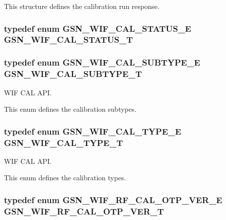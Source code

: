 This structure defines the calibration run response. \hypertarget{a00607_aa763754f7a0152deadf587aad20f022c}{
\subsubsection[{GSN\_\-WIF\_\-CAL\_\-STATUS\_\-T}]{\setlength{\rightskip}{0pt plus 5cm}typedef enum {\bf GSN\_\-WIF\_\-CAL\_\-STATUS\_\-E}  {\bf GSN\_\-WIF\_\-CAL\_\-STATUS\_\-T}}}
\label{a00607_aa763754f7a0152deadf587aad20f022c}
\hypertarget{a00607_a6fed31ed15a2c8f32a4bda91ae7c7870}{
\subsubsection[{GSN\_\-WIF\_\-CAL\_\-SUBTYPE\_\-T}]{\setlength{\rightskip}{0pt plus 5cm}typedef enum {\bf GSN\_\-WIF\_\-CAL\_\-SUBTYPE\_\-E}  {\bf GSN\_\-WIF\_\-CAL\_\-SUBTYPE\_\-T}}}
\label{a00607_a6fed31ed15a2c8f32a4bda91ae7c7870}


WIF CAL API. 

This enum defines the calibration subtypes. \hypertarget{a00607_a9dc79fa491ceafce8c7f71c92861bb43}{
\subsubsection[{GSN\_\-WIF\_\-CAL\_\-TYPE\_\-T}]{\setlength{\rightskip}{0pt plus 5cm}typedef enum {\bf GSN\_\-WIF\_\-CAL\_\-TYPE\_\-E}  {\bf GSN\_\-WIF\_\-CAL\_\-TYPE\_\-T}}}
\label{a00607_a9dc79fa491ceafce8c7f71c92861bb43}


WIF CAL API. 

This enum defines the calibration types. \hypertarget{a00607_a8cef2377b99755a5588d68051d9be59c}{
\subsubsection[{GSN\_\-WIF\_\-RF\_\-CAL\_\-OTP\_\-VER\_\-T}]{\setlength{\rightskip}{0pt plus 5cm}typedef enum {\bf GSN\_\-WIF\_\-RF\_\-CAL\_\-OTP\_\-VER\_\-E} {\bf GSN\_\-WIF\_\-RF\_\-CAL\_\-OTP\_\-VER\_\-T}}}
\label{a00607_a8cef2377b99755a5588d68051d9be59c}


